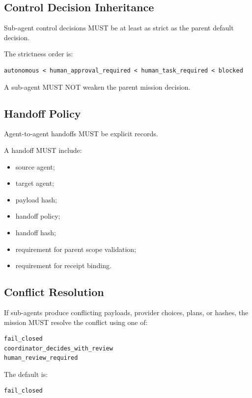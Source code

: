 \subsection{Control Decision Inheritance}

Sub-agent control decisions MUST be at least as strict as the parent default decision.

The strictness order is:

\begin{verbatim}
autonomous < human_approval_required < human_task_required < blocked
\end{verbatim}

A sub-agent MUST NOT weaken the parent mission decision.

\subsection{Handoff Policy}

Agent-to-agent handoffs MUST be explicit records.

A handoff MUST include:

\begin{itemize}
  \item source agent;
  \item target agent;
  \item payload hash;
  \item handoff policy;
  \item handoff hash;
  \item requirement for parent scope validation;
  \item requirement for receipt binding.
\end{itemize}

\subsection{Conflict Resolution}

If sub-agents produce conflicting payloads, provider choices, plans, or hashes, the mission MUST resolve the conflict using one of:

\begin{verbatim}
fail_closed
coordinator_decides_with_review
human_review_required
\end{verbatim}

The default is:

\begin{verbatim}
fail_closed
\end{verbatim}

